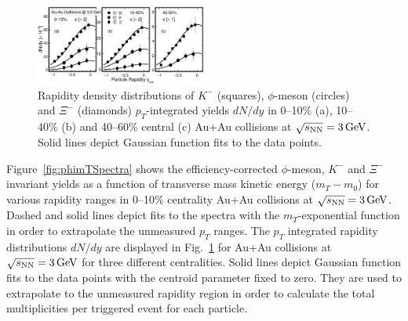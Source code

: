 \documentclass[%
 reprint,	
showpacs,
 amsmath,amssymb,
 aps,
 prc,
]{revtex4-1}
\begin{document}
\begin{figure}
\centering
\includegraphics[width=0.5\textwidth]{fig/fig3_dndy.eps}
  \caption{ Rapidity density distributions of $K^-$ (squares), $\phi$-meson (circles) and $\Xi^-$ (diamonds) $p_T$-integrated yields $dN/dy$ in 0--10\% (a), 10--40\% (b) and 40--60\% central (c) Au+Au collisions at ${\sqrt{s_{\rm NN}} = \rm{3\,GeV}}$. %
  Solid lines depict Gaussian function fits to the data points.}
\label{fig:phiYSpectra} 
\end{figure}

Figure~\ref{fig:phimTSpectra} shows the efficiency-corrected $\phi$-meson, $K^-$ and $\Xi^-$ invariant yields as a function of transverse mass kinetic energy ($m_T-m_0$) for various rapidity ranges in 0--10\% centrality Au+Au collisions at ${\sqrt{s_{\rm NN}} = \rm{3\,GeV}}$. %
Dashed and solid lines depict fits to the spectra with the $m_T$-exponential function in order to extrapolate the unmeasured $p_T$ ranges. 
The $p_T$ integrated rapidity distributions $dN/dy$ are displayed in Fig.~\ref{fig:phiYSpectra} for Au+Au collisions at ${\sqrt{s_{\rm NN}} = \rm{3\,GeV}}$ for three different centralities. %
Solid lines depict Gaussian function fits to the data points with the centroid parameter fixed to zero. They are used to extrapolate to the unmeasured rapidity region in order to calculate the total multiplicities per triggered event for each particle.
\end{document}
